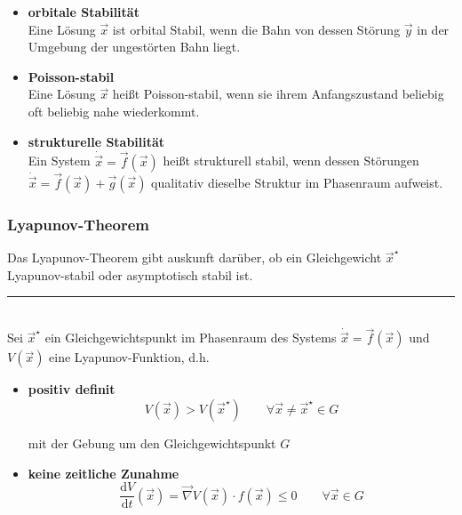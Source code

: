 \documentclass{article}
\newcommand{\diff}{\mathrm{d}}
\begin{document}
\begin{itemize}
		
		\item \textbf{orbitale Stabilität}\\
		Eine Lösung $\vec{x}$ ist orbital Stabil, wenn die Bahn von dessen Störung $\vec{y}$ in der Umgebung der ungestörten Bahn liegt.
		
		
		\item \textbf{Poisson-stabil}\\
		Eine Lösung $\vec{x}$ heißt Poisson-stabil, wenn sie ihrem Anfangszustand beliebig oft beliebig nahe wiederkommt.
		
		
		\item \textbf{strukturelle Stabilität}\\
		Ein System $\dot{\vec{x}} = \vec{f}(\vec{x})$ heißt strukturell stabil, wenn dessen Störungen $\dot{\vec{x}} = \vec{f}(\vec{x}) + \vec{g}(\vec{x})$ qualitativ dieselbe Struktur im Phasenraum aufweist.
	\end{itemize}


\newpage


\subsubsection{Lyapunov-Theorem}
Das Lyapunov-Theorem gibt auskunft darüber, ob ein Gleichgewicht $\vec{x}^\star$ Lyapunov-stabil oder asymptotisch stabil ist.

\vspace{0.5cm}

\hrule
	\\
	Sei $\vec{x}^\star$ ein Gleichgewichtspunkt im Phasenraum des Systems $\dot{\vec{x}} = \vec{f}(\vec{x})$ und $V(\vec{x})$ eine Lyapunov-Funktion, d.h.
		\begin{itemize}
			\item \textbf{positiv definit}\\
				\begin{equation}
					V(\vec{x}) > V(\vec{x}^\star) \qquad \forall \vec{x} \neq \vec{x}^\star \in G
				\end{equation}
			
			mit der Gebung um den Gleichgewichtspunkt $G$
			
			
			\item \textbf{keine zeitliche Zunahme}
				\begin{equation}
					\frac{\diff V}{\diff t}(\vec{x}) = \vec{\nabla} V(\vec{x}) \cdot f(\vec{x}) \leq 0 \qquad \forall \vec{x} \in G
				\end{equation}
		\end{itemize}
\end{document}
